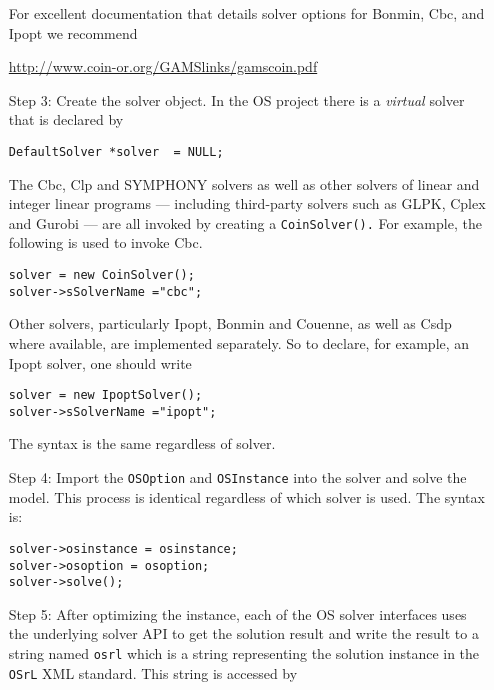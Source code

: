 \begin{itemize}
\begin{itemize}
\end{itemize}

For excellent documentation that details solver options for Bonmin, Cbc, and Ipopt  we recommend 

\begin{center}
\url{http://www.coin-or.org/GAMSlinks/gamscoin.pdf}
\end{center}


\item[Step 3:] Create the solver object. In the OS project there is a {\it virtual} solver that 
is declared by

\begin{verbatim}
DefaultSolver *solver  = NULL;
\end{verbatim}

The Cbc, Clp and SYMPHONY solvers as well as other solvers of linear and integer linear programs
--- including third-party solvers such as GLPK, Cplex and Gurobi ---  
are all invoked by creating a {\tt CoinSolver().} For example, the following is used to invoke Cbc.

\begin{verbatim}
solver = new CoinSolver();
solver->sSolverName ="cbc";
\end{verbatim}

Other solvers, particularly Ipopt, Bonmin and Couenne, as well as Csdp where available, 
are implemented separately. So to declare,
for example, an Ipopt solver, one should write

\begin{verbatim}
solver = new IpoptSolver();
solver->sSolverName ="ipopt";
\end{verbatim}

The syntax is the same regardless of solver. 

\item[Step 4:] Import the {\tt OSOption} and {\tt OSInstance} into the solver and solve the model. 
This process is identical regardless of which solver is used. The syntax is:

\begin{verbatim}
solver->osinstance = osinstance;
solver->osoption = osoption;	
solver->solve();
\end{verbatim}

\item[Step 5:] After optimizing the instance,  each of the OS solver interfaces uses the underlying solver API to get the solution result and write the result to a string 
named {\tt osrl} which is a string representing the solution instance in the {\tt OSrL} XML standard.  
This string is accessed by


\end{itemize}
